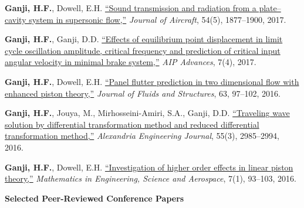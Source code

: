 \documentclass[a4paper,11pt]{article}
\begin{document}
\begin{enumerate}[
    leftmargin=*,
    labelsep=0.5em,
    align=left,
    widest={[\textbf{J.10}]},
    itemindent=0em
]
\item[\textbf{[J.6]}]
\textbf{Ganji, H.F.}, Dowell, E.H.
\href{https://arc.aiaa.org/doi/abs/10.2514/1.C034309}
{``Sound transmission and radiation from a plate--cavity system in supersonic flow,''}
\textit{Journal of Aircraft}, 54(5), 1877--1900, 2017.

\item[\textbf{[J.7]}]
\textbf{Ganji, H.F.}, Ganji, D.D.
\href{https://aip.scitation.org/doi/10.1063/1.4979609}
{``Effects of equilibrium point displacement in limit cycle oscillation amplitude, critical frequency and prediction of critical input angular velocity in minimal brake system,''}
\textit{AIP Advances}, 7(4), 2017.

\item[\textbf{[J.8]}]
\textbf{Ganji, H.F.}, Dowell, E.H.
\href{https://www.sciencedirect.com/science/article/pii/S0889974616000396}
{``Panel flutter prediction in two dimensional flow with enhanced piston theory,''}
\textit{Journal of Fluids and Structures}, 63, 97--102, 2016.

\item[\textbf{[J.9]}]
\textbf{Ganji, H.F.}, Jouya, M., Mirhosseini-Amiri, S.A., Ganji, D.D.
\href{https://www.sciencedirect.com/science/article/pii/S1110016816300680}
{``Traveling wave solution by differential transformation method and reduced differential transformation method,''}
\textit{Alexandria Engineering Journal}, 55(3), 2985--2994, 2016.

\item[\textbf{[J.10]}]
\textbf{Ganji, H.F.}, Dowell, E.H.
\href{http://nonlinearstudies.com/index.php/mesa/article/view/1287}
{``Investigation of higher order effects in linear piston theory,''}
\textit{Mathematics in Engineering, Science and Aerospace}, 7(1), 93--103, 2016.

\end{enumerate}

\vspace{1mm}

\textbf{\small Selected Peer-Reviewed Conference Papers}
\end{document}
